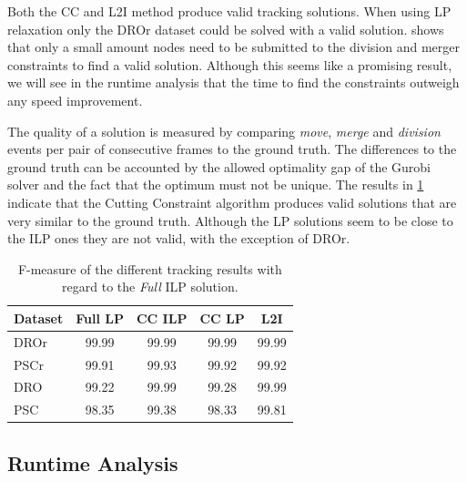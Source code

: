 \documentclass[10pt,twocolumn,letterpaper]{article}
\begin{document}
Both the CC and L2I method produce valid tracking solutions. When using LP relaxation only the DROr dataset could be solved with a valid solution.  shows that only a small amount nodes need to be submitted to the division and merger constraints to find a valid solution. Although this seems like a promising result, we will see in the runtime analysis that the time to find the constraints outweigh any speed improvement.

The quality of a solution is measured by comparing \textit{move}, \textit{merge} and \textit{division} events per pair of consecutive frames to the ground truth. The differences to the ground truth can be accounted by the allowed optimality gap of the Gurobi solver and the fact that the optimum must not be unique. The results in \cref{tab:fmeasure} indicate that the Cutting Constraint algorithm produces valid solutions that are very similar to the ground truth. Although the LP solutions seem to be close to the ILP ones they are not valid, with the exception of DROr.

\begin{table}
  \begin{center}
  \begin{tabular}{|l||c|c|c|c|}
    \hline
    Dataset & Full LP & CC ILP & CC LP & L2I\\
    \hline\hline
    DROr & 99.99 & 99.99 & 99.99 & 99.99\\
    PSCr & 99.91 & 99.93 & 99.92 & 99.92\\
    DRO & 99.22 & 99.99 & 99.28 & 99.99 \\
    PSC & 98.35 & 99.38 & 98.33 & 99.81\\
    \hline
  \end{tabular}
  \end{center}
  \caption{F-measure of the different tracking results with regard to the \textit{Full} ILP solution.}
  \label{tab:fmeasure}
\end{table}


\subsection{Runtime Analysis}
\end{document}
